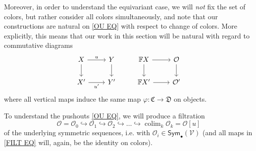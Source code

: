 \documentclass[a4paper,10pt
,draft
]{article}%
\numberwithin{equation}{section}
\numberwithin{figure}{section}
\theoremstyle{definition} %
\newcommand{\into}{\hookrightarrow}%
\DeclareMathOperator{\colim}{colim}%
\renewcommand{\O}{\ensuremath{\mathcal O}}
\newcommand{\1}{\ensuremath{\mathbbm 1}}%
\begin{document}
Moreover, in order to understand the equivariant case, 
we will \emph{not} fix the set of colors,  
but rather consider all colors simultaneously, 
and note that our constructions are natural 
on \eqref{OU EQ} with respect to change of colors.
More explicitly, this means that our work in this section will be natural with regard to commutative diagrams
\begin{equation}\label{COLORCHNAT EQ}
	\begin{tikzcd}
		X \arrow[r, "u"',swap] \arrow[d]
	&
		Y \arrow[d]
&
		\mathbb F X \arrow[d] \arrow[r]
	&
		\O \arrow[d]
\\
		X' \arrow[r, "u'"']
	&
		Y'
&
		\mathbb F X' \arrow[r]
	&
		\O'
	\end{tikzcd}
\end{equation}
where all vertical maps induce the same map 
$\varphi \colon \mathfrak{C} \to \mathfrak{D}$ on objects.


To understand the pushouts \eqref{OU EQ},
we will produce a filtration
\begin{equation}\label{FILT EQ}
      \O = \O_0 \into \O_1 \into \O_2 \into \dots \into \colim_k \O_k = \O[u]
\end{equation}
of the underlying symmetric sequences, i.e. with 
$\mathcal{O}_i \in \mathsf{Sym}_{\bullet}(\mathcal{V})$
(and all maps in \eqref{FILT EQ} will, again, be the identity on colors).
\end{document}
